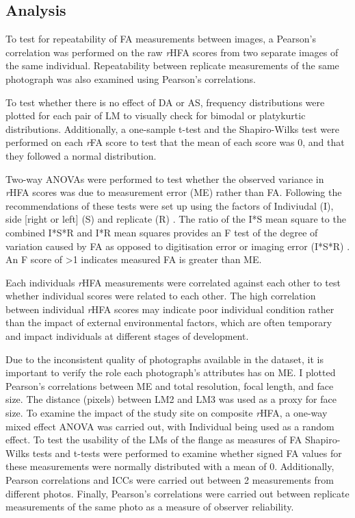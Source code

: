 \subsection{Analysis}
To test for repeatability of FA measurements between images, a Pearson's correlation was performed on the raw \textit{r}HFA scores from two separate images of the same individual. Repeatability between replicate measurements of the same photograph was also examined using Pearson's correlations.

To test whether there is no effect of DA or AS, frequency distributions were plotted for each pair of LM to visually check for bimodal or platykurtic distributions. Additionally, a one-sample t-test and the Shapiro-Wilks test were performed on each \textit{r}FA score to test that the mean of each score was 0, and that they followed a normal distribution.

Two-way ANOVAs were performed to test whether the observed variance in \textit{r}HFA scores was due to measurement error (ME) rather than FA.  Following the recommendations of \citet{Palmer.1986} these tests were set up using the factors of Indiviudal (I), side [right or left] (S) and replicate (R) \citep{Palmer.1986} . The ratio of the I*S mean square to the combined I*S*R and I*R mean squares provides an F test of the degree of variation caused by FA as opposed to digitisation error or imaging error (I*S*R) \citep{Swaddle.1994}. An F score of >1 indicates measured FA is greater than ME.

Each individuals \textit{r}HFA measurements were correlated against each other to test whether individual scores were related to each other. The high correlation between individual \textit{r}HFA scores may indicate poor individual condition rather than the impact of external environmental factors, which are often temporary and impact individuals at different stages of development. 

Due to the inconsistent quality of photographs available in the dataset, it is important to verify the role each photograph's attributes has on ME. I plotted Pearson's correlations between ME and total resolution, focal length, and face size. The distance (pixels) between LM2 and LM3 was used as a proxy for face size. To examine the impact of the study site on composite \textit{r}HFA, a one-way mixed effect ANOVA was carried out, with Individual being used as a random effect. To test the usability of the LMs of the flange as measures of FA Shapiro-Wilks tests and t-tests were performed to examine whether signed FA values for these measurements were normally distributed with a mean of 0. Additionally, Pearson correlations and ICCs were carried out between 2 measurements from different photos. Finally, Pearson's correlations were carried out between replicate measurements of the same photo as a measure of observer reliability.

